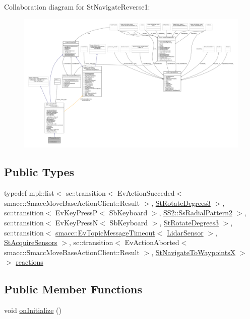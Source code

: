 Collaboration diagram for St\+Navigate\+Reverse1\+:
\nopagebreak
\begin{figure}[H]
\begin{center}
\leavevmode
\includegraphics[width=350pt]{structStNavigateReverse1__coll__graph}
\end{center}
\end{figure}
\subsection*{Public Types}
\begin{DoxyCompactItemize}
\item 
typedef mpl\+::list$<$ sc\+::transition$<$ Ev\+Action\+Succeded$<$ smacc\+::\+Smacc\+Move\+Base\+Action\+Client\+::\+Result $>$, \hyperlink{structStRotateDegrees3}{St\+Rotate\+Degrees3} $>$, sc\+::transition$<$ Ev\+Key\+PressP$<$ Sb\+Keyboard $>$, \hyperlink{structSS2_1_1SsRadialPattern2}{S\+S2\+::\+Ss\+Radial\+Pattern2} $>$, sc\+::transition$<$ Ev\+Key\+PressN$<$ Sb\+Keyboard $>$, \hyperlink{structStRotateDegrees3}{St\+Rotate\+Degrees3} $>$, sc\+::transition$<$ \hyperlink{structsmacc_1_1EvTopicMessageTimeout}{smacc\+::\+Ev\+Topic\+Message\+Timeout}$<$ \hyperlink{sensor__state_8h_a9db9e1944f88de79507758d08e4a2ee3}{Lidar\+Sensor} $>$, \hyperlink{structStAcquireSensors}{St\+Acquire\+Sensors} $>$, sc\+::transition$<$ Ev\+Action\+Aborted$<$ smacc\+::\+Smacc\+Move\+Base\+Action\+Client\+::\+Result $>$, \hyperlink{structStNavigateToWaypointsX}{St\+Navigate\+To\+WaypointsX} $>$ $>$ \hyperlink{structStNavigateReverse1_aa19535e726caf8ff80a083ea12ba05af}{reactions}
\end{DoxyCompactItemize}
\subsection*{Public Member Functions}
\begin{DoxyCompactItemize}
\item 
void \hyperlink{structStNavigateReverse1_a1931019c55ee6ff0330fdf0ec04f96eb}{on\+Initialize} ()
\end{DoxyCompactItemize}
